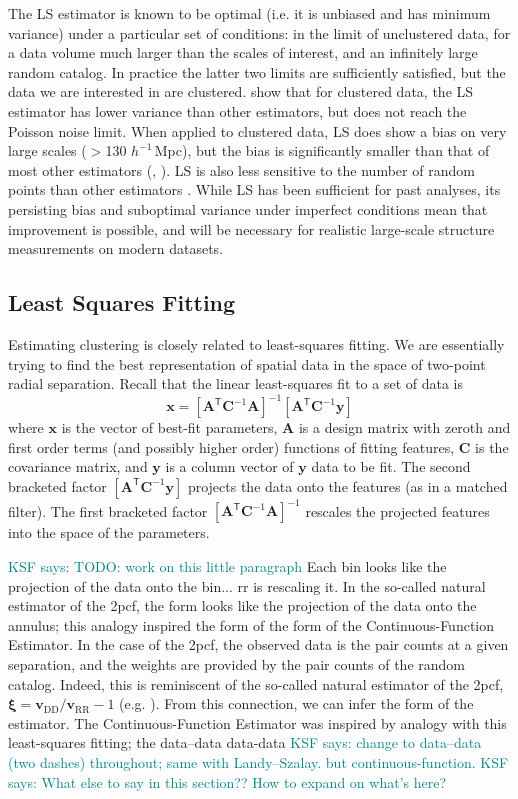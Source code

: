 \documentclass[modern]{aastex62}
\newcommand{\cf}{2pcf\xspace} %
\newcommand{\Est}{The Continuous-Function Estimator\xspace}
\newcommand{\est}{the Continuous-Function Estimator\xspace}
\newcommand{\LS}{LS\xspace}
\newcommand{\inv}{^{-1}}
\newcommand{\T}{^{\mathsf{T}}}
\newcommand{\hmpc}{$h^{-1}\,$Mpc}
\newcommand{\bld}[1]{\bm{#1}} %
\newcommand{\vv}[1]{\bld{v}_\mathrm{#1}}
\newcommand{\KSF}[1]{\textcolor{teal}{KSF says: #1}}
\begin{document}
The \LS estimator is known to be optimal (i.e. it is unbiased and has minimum variance) under a particular set of conditions: in the limit of unclustered data, for a data volume much larger than the scales of interest, and an infinitely large random catalog. 
In practice the latter two limits are sufficiently satisfied, but the data we are interested in are clustered.
\cite{VargasMagana2013} show that for clustered data, the \LS estimator has lower variance than other estimators, but does not reach the Poisson noise limit.
When applied to clustered data, \LS does show a bias on very large scales ($>$130 \hmpc), but the bias is significantly smaller than that of most other estimators (\citealt{Kerscher1999}, \citealt{VargasMagana2013}).
\LS is also less sensitive to the number of random points than other estimators \citep{Kerscher2000}.
While \LS has been sufficient for past analyses, its persisting bias and suboptimal variance under imperfect conditions mean that improvement is possible, and will be necessary for realistic large-scale structure measurements on modern datasets.

\subsection{Least Squares Fitting}

Estimating clustering is closely related to least-squares fitting.
We are essentially trying to find the best representation of spatial data in the space of two-point radial separation.
Recall that the linear least-squares fit to a set of data is
\begin{equation}
\bld{x} = [\bld{A}\T \bld{C}\inv \bld{A}]\inv [\bld{A}\T \bld{C}\inv \bld{y}]
\end{equation}
where $\bld{x}$ is the vector of best-fit parameters, $\bld{A}$ is a design matrix with zeroth and first order terms (and possibly higher order) functions of fitting features, $\bld{C}$ is the covariance matrix, and $\bld{y}$ is a column vector of $\bld{y}$ data to be fit.
The second bracketed factor $[\bld{A}\T \bld{C}\inv \bld{y}]$ projects the data onto the features (as in a matched filter). 
The first bracketed factor $[\bld{A}\T \bld{C}\inv \bld{A}]\inv$ rescales the projected features into the space of the parameters.

\KSF{TODO: work on this little paragraph}
Each bin looks like the projection of the data onto the bin... rr is rescaling it.
In the so-called natural estimator of the \cf, the form looks like the projection of the data onto the annulus; this analogy inspired the form of the form of \est.
In the case of the \cf, the observed data is the pair counts at a given separation, and the weights are provided by the pair counts of the random catalog.
Indeed, this is reminiscent of the so-called natural estimator of the \cf, $\bld{\xi} = \vv{DD}/\vv{RR} - 1$ (e.g. \citealt{Kerscher2000}).
From this connection, we can infer the form of the estimator.
\Est was inspired by analogy with this least-squares fitting; the data--data data-data
\KSF{change to data--data (two dashes) throughout; same with Landy--Szalay. but continuous-function.}
\KSF{What else to say in this section?? How to expand on what's here?}
\end{document}
